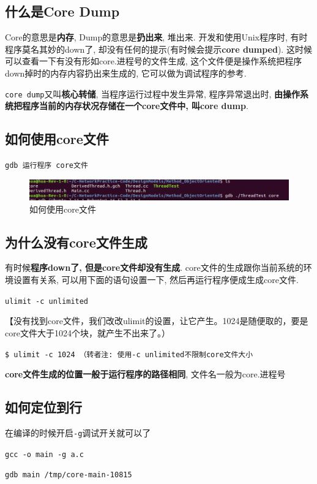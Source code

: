 \documentclass[UTF8,a4paper,12pt]{ctexbook}
\begin{document}
		\subsection{什么是Core Dump}
		Core的意思是\textbf{内存}, Dump的意思是\textbf{扔出来}, 堆出来.
		开发和使用Unix程序时, 有时程序莫名其妙的down了, 却没有任何的提示(有时候会提示\textbf{core dumped}). 这时候可以查看一下有没有形如core.进程号的文件生成, 这个文件便是操作系统把程序down掉时的内存内容扔出来生成的, 它可以做为调试程序的参考.
		
		\verb|core dump|又叫\textbf{核心转储}, 当程序运行过程中发生异常, 程序异常退出时, \textbf{由操作系统把程序当前的内存状况存储在一个core文件中, 叫core dump}.
		
		\subsection{如何使用core文件}
		\verb|gdb 运行程序 core文件|
			\begin{figure}[h]
				\centering
				\includegraphics[scale=0.4]{figures/core.png}
				\caption{如何使用core文件}
			\end{figure}
		
		\subsection{为什么没有core文件生成}
		有时候\textbf{程序down了, 但是core文件却没有生成}. core文件的生成跟你当前系统的环境设置有关系, 可以用下面的语句设置一下, 然后再运行程序便成生成core文件.
		
		\verb|ulimit -c unlimited|
		
		【没有找到core文件，我们改改ulimit的设置，让它产生。1024是随便取的，要是core文件大于1024个块，就产生不出来了。）
		
		\verb|$ ulimit -c 1024 （转者注: 使用-c unlimited不限制core文件大小|
		
		\textbf{core文件生成的位置一般于运行程序的路径相同}, 文件名一般为core.进程号
	
		\subsection{如何定位到行}
		 在编译的时候开启\verb|-g|调试开关就可以了
		 
		 \verb|gcc -o main -g a.c|
		 
		 \verb|gdb main /tmp/core-main-10815 |
		 
\end{document}
